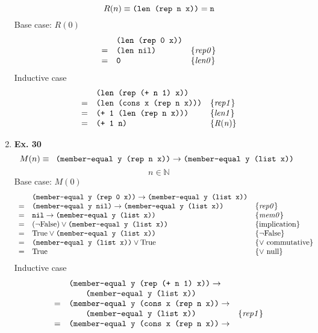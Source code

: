 \documentclass[fleqn]{article}
\newenvironment{proof}
  {\[\begin{array}{lll}}
  {\end{array}\]}
\newcommand{\law}[1]{\{\mathit{#1}\}}
\newcommand{\True}[0]{\mathrm{True}}
\newcommand{\False}[0]{\mathrm{False}}
\renewcommand{\c}[1]{\mbox{\texttt{#1}}}
\begin{document}
\begin{enumerate}
      \[ R(n) \equiv \c{(len (rep n x))} = \c{n} \]
      Base case: $R(0)$
      \begin{proof}
          & \c{(len (rep 0 x))} & \\
        = & \c{(len nil)} & \law{rep0} \\
        = & \c{0} & \law{len0} \\
      \end{proof}
      Inductive case
      \begin{proof}
          & \c{(len (rep (+ n 1) x))} & \\
        = & \c{(len (cons x (rep n x)))} & \law{rep1} \\
        = & \c{(+ 1 (len (rep n x)))} & \law{len1} \\
        = & \c{(+ 1 n)} & \law{R(n)} \\
      \end{proof}
    \item {\bf Ex. 30}
      \[ M(n) \equiv \c{ (member-equal y (rep n x))} \to \c{(member-equal y (list x)) } \]
      \[ n \in \mathbb{N} \]
      Base case: $M(0)$
      \begin{proof}
          & \c{(member-equal y (rep 0 x))} \to \c{(member-equal y (list x))} & \\
        = & \c{(member-equal y nil)} \to \c{(member-equal y (list x))} & \law{rep0} \\
        = & \c{nil} \to \c{(member-equal y (list x))} & \law{mem0} \\
        = & (\neg \False) \vee \c{(member-equal y (list x))} & \law{\mathrm{implication}} \\
        = & \True \vee \c{(member-equal y (list x))} & \law{\neg\False} \\
        = & \c{(member-equal y (list x))} \vee \True & \law{\vee\ \mathrm{commutative}} \\
        = & \True & \law{\vee\ \mathrm{null}} \\
      \end{proof}
      Inductive case
      \begin{proof}
          & \c{(member-equal y (rep (+ n 1) x))} \to & \\
          & \qquad \c{(member-equal y (list x))} & \\
        = & \c{(member-equal y (cons x (rep n x))} \to & \\
          & \qquad \c{(member-equal y (list x))} & \law{rep1} \\
        = & \c{(member-equal y (cons x (rep n x))} \to & \\

\end{proof}
\end{enumerate}
\end{document}
